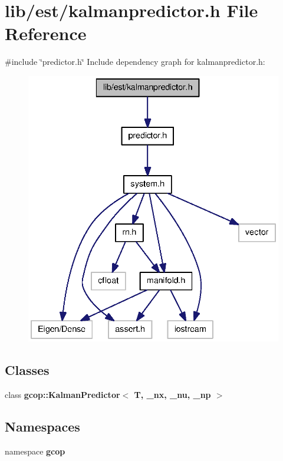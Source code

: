 \section{lib/est/kalmanpredictor.h \-File \-Reference}
\label{kalmanpredictor_8h}
{\ttfamily \#include \char`\"{}predictor.\-h\char`\"{}}\*
\-Include dependency graph for kalmanpredictor.\-h\-:
\nopagebreak
\begin{figure}[H]
\begin{center}
\leavevmode
\includegraphics[width=336pt]{kalmanpredictor_8h__incl}
\end{center}
\end{figure}
\subsection*{\-Classes}
\begin{DoxyCompactItemize}
\item 
class {\bf gcop\-::\-Kalman\-Predictor$<$ T, \-\_\-nx, \-\_\-nu, \-\_\-np $>$}
\end{DoxyCompactItemize}
\subsection*{\-Namespaces}
\begin{DoxyCompactItemize}
\item 
namespace {\bf gcop}
\end{DoxyCompactItemize}
